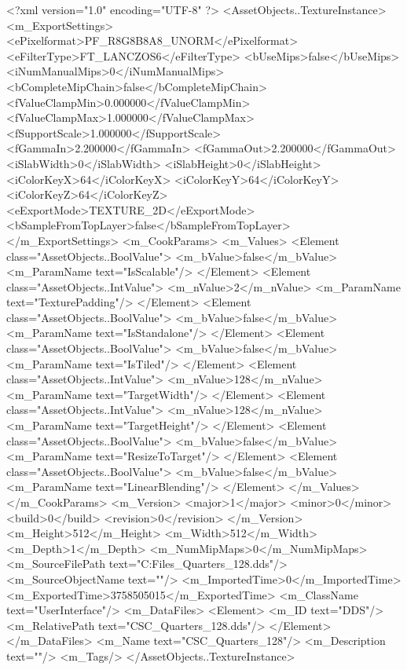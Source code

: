 <?xml version="1.0" encoding="UTF-8" ?>
<AssetObjects..TextureInstance>
	<m_ExportSettings>
		<ePixelformat>PF_R8G8B8A8_UNORM</ePixelformat>
		<eFilterType>FT_LANCZOS6</eFilterType>
		<bUseMips>false</bUseMips>
		<iNumManualMips>0</iNumManualMips>
		<bCompleteMipChain>false</bCompleteMipChain>
		<fValueClampMin>0.000000</fValueClampMin>
		<fValueClampMax>1.000000</fValueClampMax>
		<fSupportScale>1.000000</fSupportScale>
		<fGammaIn>2.200000</fGammaIn>
		<fGammaOut>2.200000</fGammaOut>
		<iSlabWidth>0</iSlabWidth>
		<iSlabHeight>0</iSlabHeight>
		<iColorKeyX>64</iColorKeyX>
		<iColorKeyY>64</iColorKeyY>
		<iColorKeyZ>64</iColorKeyZ>
		<eExportMode>TEXTURE_2D</eExportMode>
		<bSampleFromTopLayer>false</bSampleFromTopLayer>
	</m_ExportSettings>
	<m_CookParams>
		<m_Values>
			<Element class="AssetObjects..BoolValue">
				<m_bValue>false</m_bValue>
				<m_ParamName text="IsScalable"/>
			</Element>
			<Element class="AssetObjects..IntValue">
				<m_nValue>2</m_nValue>
				<m_ParamName text="TexturePadding"/>
			</Element>
			<Element class="AssetObjects..BoolValue">
				<m_bValue>false</m_bValue>
				<m_ParamName text="IsStandalone"/>
			</Element>
			<Element class="AssetObjects..BoolValue">
				<m_bValue>false</m_bValue>
				<m_ParamName text="IsTiled"/>
			</Element>
			<Element class="AssetObjects..IntValue">
				<m_nValue>128</m_nValue>
				<m_ParamName text="TargetWidth"/>
			</Element>
			<Element class="AssetObjects..IntValue">
				<m_nValue>128</m_nValue>
				<m_ParamName text="TargetHeight"/>
			</Element>
			<Element class="AssetObjects..BoolValue">
				<m_bValue>false</m_bValue>
				<m_ParamName text="ResizeToTarget"/>
			</Element>
			<Element class="AssetObjects..BoolValue">
				<m_bValue>false</m_bValue>
				<m_ParamName text="LinearBlending"/>
			</Element>
		</m_Values>
	</m_CookParams>
	<m_Version>
		<major>1</major>
		<minor>0</minor>
		<build>0</build>
		<revision>0</revision>
	</m_Version>
	<m_Height>512</m_Height>
	<m_Width>512</m_Width>
	<m_Depth>1</m_Depth>
	<m_NumMipMaps>0</m_NumMipMaps>
	<m_SourceFilePath text="C:\Users\Shadow\Desktop\Working Files\Icons\Quarters\CSC_Quarters_128.dds"/>
	<m_SourceObjectName text=""/>
	<m_ImportedTime>0</m_ImportedTime>
	<m_ExportedTime>3758505015</m_ExportedTime>
	<m_ClassName text="UserInterface"/>
	<m_DataFiles>
		<Element>
			<m_ID text="DDS"/>
			<m_RelativePath text="CSC_Quarters_128.dds"/>
		</Element>
	</m_DataFiles>
	<m_Name text="CSC_Quarters_128"/>
	<m_Description text=""/>
	<m_Tags/>
</AssetObjects..TextureInstance>

